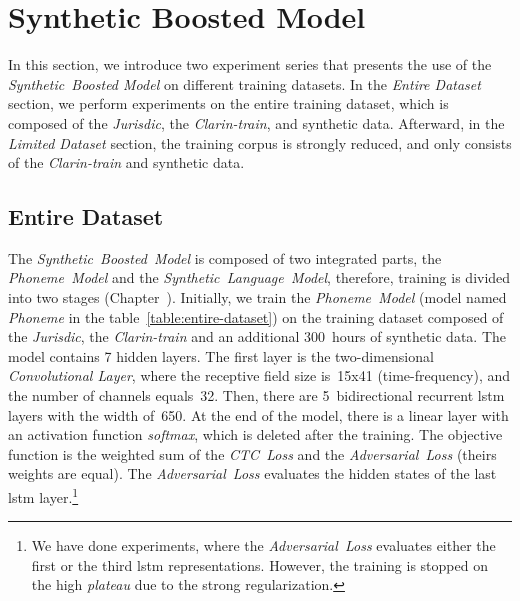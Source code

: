 \section{Synthetic Boosted Model}\label{sec:synthetic-boosted-model}

In this section, we introduce two experiment series that presents
the use of the \textit{Synthetic~Boosted Model} on different training datasets.
In the \textit{Entire Dataset} section, we perform experiments on the entire training dataset,
which is composed of the \textit{Jurisdic}, the \textit{Clarin-train}, and synthetic data.
Afterward, in the \textit{Limited Dataset} section, the training corpus is strongly reduced,
and only consists of the \textit{Clarin-train} and synthetic data.


\subsection*{Entire Dataset}

The \textit{Synthetic~Boosted~Model} is composed of two integrated parts, the \textit{Phoneme~Model}
and the \textit{Synthetic~Language~Model}, therefore, training is divided into two stages (Chapter~).
Initially, we train the \textit{Phoneme~Model} (model named \textit{Phoneme} in the table~\ref{table:entire-dataset})
on the training dataset composed of the \textit{Jurisdic}, the \textit{Clarin-train} and an additional
300~hours of synthetic data.
The model contains 7 hidden layers.
The first layer is the two-dimensional \textit{Convolutional Layer}, where the receptive field size
is~15x41 (time-frequency), and the number of channels equals~32.
Then, there are 5~bidirectional recurrent \acrshort{lstm} layers with the width of~650.
At the end of the model, there is a linear layer with an activation function \textit{softmax},
which is deleted after the training.
The objective function is the weighted sum of the \textit{CTC~Loss} and the \textit{Adversarial~Loss} (theirs weights are equal).
The \textit{Adversarial~Loss} evaluates the hidden states of the last \acrshort{lstm} layer.\footnote{
We have done experiments, where the \textit{Adversarial~Loss} evaluates either the first or the third \acrshort{lstm} representations.
However, the training is stopped on the high \textit{plateau} due to the strong regularization.
}

